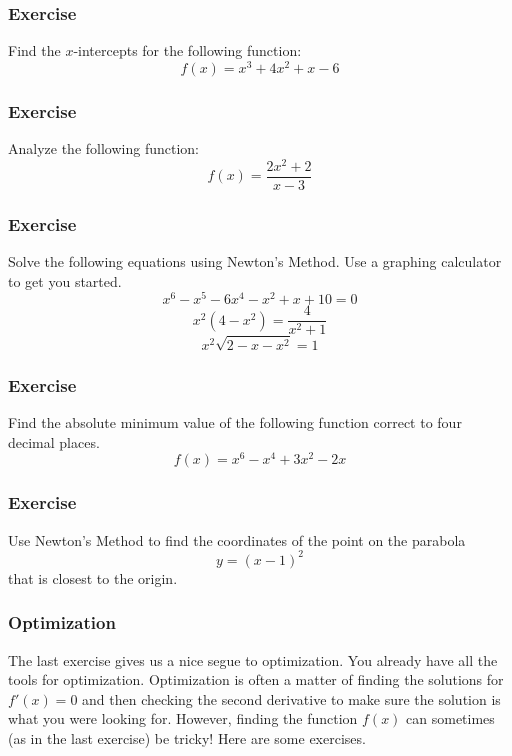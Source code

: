 \documentclass[xcolor=dvipsnames]{beamer}
\begin{document}
\begin{frame}
  \frametitle{Exercise}
{\ubung} Find the $x$-intercepts for the following function:
\begin{equation}
  \label{eq:yiceepuo}
  f(x)=x^{3}+4x^{2}+x-6
\end{equation}
\end{frame}

\begin{frame}
  \frametitle{Exercise}
{\ubung} Analyze the following function:
\begin{equation}
  \label{eq:aehoilao}
  f(x)=\frac{2x^{2}+2}{x-3}
\end{equation}
\end{frame}

\begin{frame}
  \frametitle{Exercise}
{\ubung} Solve the following equations using Newton's Method. Use a
graphing calculator to get you started.
\begin{equation}
  \label{eq:xeigheuy}
  x^{6}-x^{5}-6x^{4}-x^{2}+x+10=0
\end{equation}
\begin{equation}
  \label{eq:ohtharoh}
  x^{2}(4-x^{2})=\frac{4}{x^{2}+1}
\end{equation}
\begin{equation}
  \label{eq:iejuangi}
  x^{2}\sqrt{2-x-x^{2}}=1
\end{equation}
\end{frame}

\begin{frame}
  \frametitle{Exercise}
{\ubung} Find the absolute minimum value of the following function
correct to four decimal places.
\begin{equation}
  \label{eq:veiyeini}
  f(x)=x^{6}-x^{4}+3x^{2}-2x
\end{equation}
\end{frame}

\begin{frame}
  \frametitle{Exercise}
{\ubung} Use Newton's Method to find the coordinates of the point on
the parabola
\begin{equation}
  \label{eq:laingiun}
  y=(x-1)^{2}
\end{equation}
that is closest to the origin.
\end{frame}

\begin{frame}
  \frametitle{Optimization}
  The last exercise gives us a nice segue to \alert{optimization}. You
  already have all the tools for optimization. Optimization is often a
  matter of finding the solutions for $f'(x)=0$ and then checking the
  second derivative to make sure the solution is what you were looking
  for. However, finding the function $f(x)$ can sometimes (as in the
  last exercise) be tricky! Here are some exercises.
\end{frame}
\end{document}
